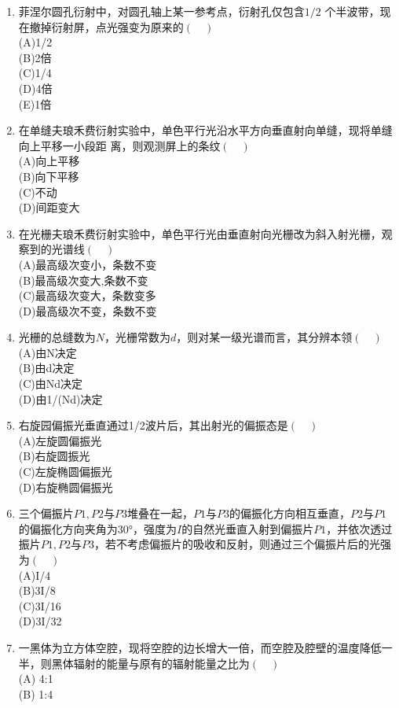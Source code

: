 \begin{enumerate}
\item 菲涅尔圆孔衍射中，对圆孔轴上某一参考点，衍射孔仅包含$ 1/2$ 个半波带，现在撤掉衍射屏，点光强变为原来的$(\quad)$\\
(A)1/2\\
(B)2倍\\
(C)1/4\\
(D)4倍\\
(E)1倍
\item 在单缝夫琅禾费衍射实验中，单色平行光沿水平方向垂直射向单缝，现将单缝向上平移一小段距
离，则观测屏上的条纹$(\quad)$\\
(A)向上平移\\
(B)向下平移\\
(C)不动\\
(D)间距变大
\item 在光栅夫琅禾费衍射实验中，单色平行光由垂直射向光栅改为斜入射光栅，观察到的光谱线$(\quad)$\\
(A)最高级次变小，条数不变\\
(B)最高级次变大,条数不变\\
(C)最高级次变大，条数变多\\
(D)最高级次不变，条数不变
\item 光栅的总缝数为$N$，光栅常数为$d$，则对某一级光谱而言，其分辨本领$(\quad)$\\
(A)由N决定\\
(B)由d决定\\
(C)由Nd决定\\
(D)由1/(Nd)决定
\item 右旋园偏振光垂直通过1/2波片后，其出射光的偏振态是$(\quad)$\\
(A)左旋圆偏振光\\
(B)右旋圆振光\\
(C)左旋椭圆偏振光\\
(D)右旋椭圆偏振光
\item 三个偏振片$P1,P2$与$P3$堆叠在一起，$P1$与$P3$的偏振化方向相互垂直，$P2$与$P1$的偏振化方向夹角为30°，强度为$I$的自然光垂直入射到偏振片$P1$，并依次透过振片$P1,P2$与$P3$，若不考虑偏振片的吸收和反射，则通过三个偏振片后的光强为$(\quad)$\\
(A)I/4\\
(B)3I/8\\
(C)3I/16\\
(D)3I/32
\item 一黑体为立方体空腔，现将空腔的边长增大一倍，而空腔及腔壁的温度降低一半，则黑体辐射的能量与原有的辐射能量之比为$(\quad)$\\
(A) 4:1\\
(B) 1:4\\

\end{enumerate}
